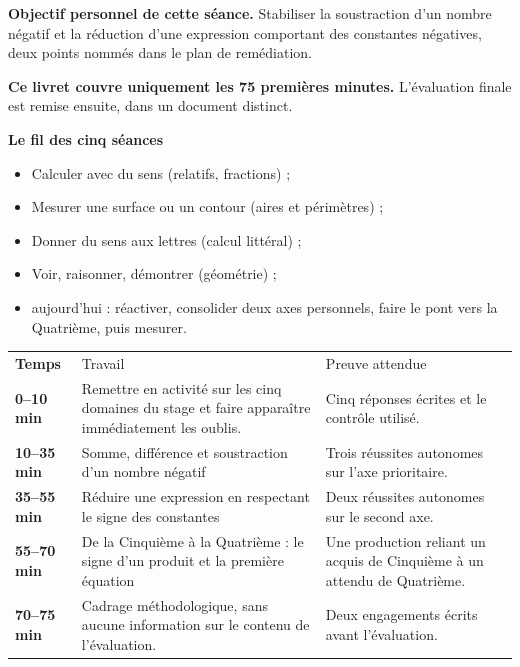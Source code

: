 \documentclass[10pt,a4paper]{article}
\begin{document}
\begin{goalbox}
\textbf{Objectif personnel de cette séance.} Stabiliser la soustraction d'un nombre négatif et la réduction d'une expression comportant des constantes négatives, deux points nommés dans le plan de remédiation.
\par\medskip
\textbf{Ce livret couvre uniquement les 75 premières minutes.} L'évaluation finale est remise ensuite, dans un document distinct.
\end{goalbox}
\begin{methodbox}
\textbf{Le fil des cinq séances}
\begin{itemize}[leftmargin=13mm,labelsep=3mm,itemsep=1.5pt]
\item[\textbf{\color{Navy}S1}] Calculer avec du sens (relatifs, fractions) ;
\item[\textbf{\color{Navy}S2}] Mesurer une surface ou un contour (aires et périmètres) ;
\item[\textbf{\color{Navy}S3}] Donner du sens aux lettres (calcul littéral) ;
\item[\textbf{\color{Navy}S4}] Voir, raisonner, démontrer (géométrie) ;
\item[\textbf{\color{Navy}S5}] aujourd'hui : réactiver, consolider deux axes personnels, faire le pont vers la Quatrième, puis mesurer.
\end{itemize}
\end{methodbox}
\par\noindent\begin{tabularx}{\linewidth}{>{\bfseries}p{20mm} X X}
\rowcolor{Navy}\color{white}Temps & \color{white}Travail & \color{white}Preuve attendue \\
0--10 min & Remettre en activité sur les cinq domaines du stage et faire apparaître immédiatement les oublis. & Cinq réponses écrites et le contrôle utilisé. \\
10--35 min & Somme, différence et soustraction d'un nombre négatif & Trois réussites autonomes sur l'axe prioritaire. \\
35--55 min & Réduire une expression en respectant le signe des constantes & Deux réussites autonomes sur le second axe. \\
55--70 min & De la Cinquième à la Quatrième : le signe d'un produit et la première équation & Une production reliant un acquis de Cinquième à un attendu de Quatrième. \\
70--75 min & Cadrage méthodologique, sans aucune information sur le contenu de l'évaluation. & Deux engagements écrits avant l'évaluation. \\
\end{tabularx}
\end{document}
